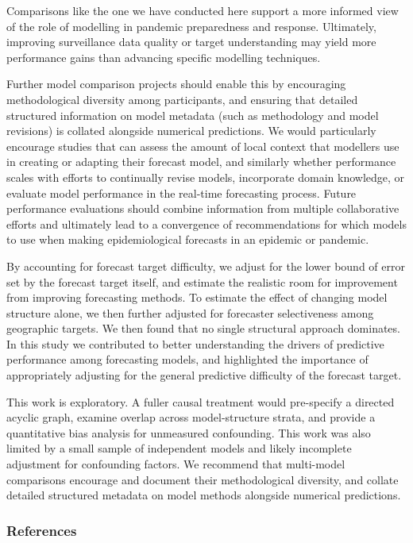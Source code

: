 \documentclass[
  letterpaper,
  DIV=11,
  numbers=noendperiod]{scrartcl}
\begin{document}
Comparisons like the one we have conducted here support a more informed
view of the role of modelling in pandemic preparedness and response.
Ultimately, improving surveillance data quality or target understanding
may yield more performance gains than advancing specific modelling
techniques.

Further model comparison projects should enable this by encouraging
methodological diversity among participants, and ensuring that detailed
structured information on model metadata (such as methodology and model
revisions) is collated alongside numerical predictions. We would
particularly encourage studies that can assess the amount of local
context that modellers use in creating or adapting their forecast model,
and similarly whether performance scales with efforts to continually
revise models, incorporate domain knowledge, or evaluate model
performance in the real-time forecasting process. Future performance
evaluations should combine information from multiple collaborative
efforts and ultimately lead to a convergence of recommendations for
which models to use when making epidemiological forecasts in an epidemic
or pandemic.

By accounting for forecast target difficulty, we adjust for the lower
bound of error set by the forecast target itself, and estimate the
realistic room for improvement from improving forecasting methods. To
estimate the effect of changing model structure alone, we then further
adjusted for forecaster selectiveness among geographic targets. We then
found that no single structural approach dominates. In this study we
contributed to better understanding the drivers of predictive
performance among forecasting models, and highlighted the importance of
appropriately adjusting for the general predictive difficulty of the
forecast target.

This work is exploratory. A fuller causal treatment would pre-specify a
directed acyclic graph, examine overlap across model-structure strata,
and provide a quantitative bias analysis for unmeasured confounding.
This work was also limited by a small sample of independent models and
likely incomplete adjustment for confounding factors. We recommend that
multi-model comparisons encourage and document their methodological
diversity, and collate detailed structured metadata on model methods
alongside numerical predictions.

\subsubsection{References}\label{references}
\end{document}
